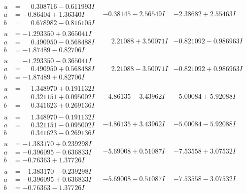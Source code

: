 \documentclass[1p]{elsarticle_modified}
\theoremstyle{definition}
\begin{document}
$$\begin{array}{c|c|c}
\begin{aligned}
u &= \phantom{-}0.308716 - 0.611993 I \\
a &= -0.86404 + 1.36340 I \\
b &= \phantom{-}0.678982 - 0.816105 I\end{aligned}
 & -0.38145 - 2.56549 I & -2.38682 + 2.55463 I \\ \hline\begin{aligned}
u &= -1.293350 + 0.365041 I \\
a &= \phantom{-}0.490950 - 0.568488 I \\
b &= -1.87489 - 0.82706 I\end{aligned}
 & \phantom{-}2.21088 + 3.50071 I & -0.821092 - 0.986963 I \\ \hline\begin{aligned}
u &= -1.293350 - 0.365041 I \\
a &= \phantom{-}0.490950 + 0.568488 I \\
b &= -1.87489 + 0.82706 I\end{aligned}
 & \phantom{-}2.21088 - 3.50071 I & -0.821092 + 0.986963 I \\ \hline\begin{aligned}
u &= \phantom{-}1.348970 + 0.191132 I \\
a &= \phantom{-}0.321151 + 0.095002 I \\
b &= \phantom{-}0.341623 + 0.269136 I\end{aligned}
 & -4.86135 - 3.43962 I & -5.00084 + 5.92088 I \\ \hline\begin{aligned}
u &= \phantom{-}1.348970 - 0.191132 I \\
a &= \phantom{-}0.321151 - 0.095002 I \\
b &= \phantom{-}0.341623 - 0.269136 I\end{aligned}
 & -4.86135 + 3.43962 I & -5.00084 - 5.92088 I \\ \hline\begin{aligned}
u &= -1.383170 + 0.239298 I \\
a &= -0.396095 - 0.636833 I \\
b &= -0.76363 + 1.37726 I\end{aligned}
 & -5.69008 + 0.51087 I & -7.53558 + 3.07532 I \\ \hline\begin{aligned}
u &= -1.383170 - 0.239298 I \\
a &= -0.396095 + 0.636833 I \\
b &= -0.76363 - 1.37726 I\end{aligned}
 & -5.69008 - 0.51087 I & -7.53558 - 3.07532 I \\ \hline\begin{aligned}

\end{aligned}
\end{array}$$
\end{document}
